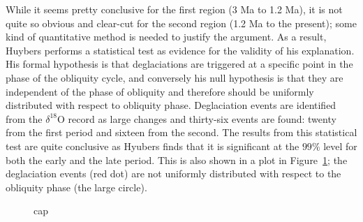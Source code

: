 \documentclass[11pt]{article}
\begin{document}
While it seems pretty conclusive for the first region (3 Ma to 1.2 Ma), it is not quite so obvious and clear-cut for the second region (1.2 Ma to the present); some kind of quantitative method is needed to justify the argument.
As a result, Huybers performs a statistical test as evidence for the validity of his explanation\cite{huybers}.
His formal hypothesis is that deglaciations are triggered at a specific point in the phase of the obliquity cycle, and conversely his null hypothesis is that they are independent of the phase of obliquity and therefore should be uniformly distributed with respect to obliquity phase.
Deglaciation events are identified from the $\delta^{18}$O record as large changes and thirty-six events are found: twenty from the first period and sixteen from the second.
The results from this statistical test are quite conclusive as Hyubers finds that it is significant at the $99\%$ level for both the early and the late period.
This is also shown in a plot in Figure~\ref{hypotest}; the deglaciation events (red dot) are not uniformly distributed with respect to the obliquity phase (the large circle).

\begin{figure}
  \centering
  \caption{cap}
  \label{hypotest}
\end{figure}
\end{document}
